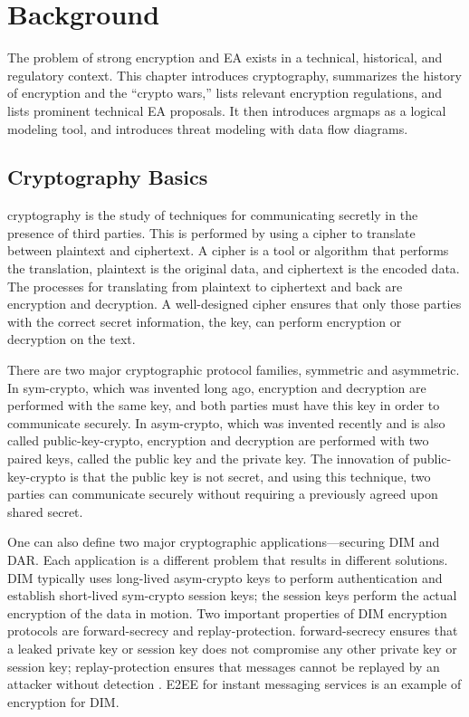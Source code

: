\chapter{Background}
\label{chap-background}

The problem of strong encryption and \acl{EA} exists in a technical, historical, and regulatory context. This chapter
introduces cryptography, summarizes the history of encryption and the ``crypto wars,'' lists relevant encryption
regulations, and lists prominent technical \ac{EA} proposals. It then introduces \acp{argmap} as a logical modeling
tool, and introduces threat modeling with data flow diagrams.



\section{Cryptography Basics}
\label{sec-crypto-basics}

\Ac{cryptography} is the study of techniques for communicating secretly in the presence of third parties. This is
performed by using a \ac{cipher} to translate between \ac{plaintext} and \ac{ciphertext}. A cipher is a tool or
algorithm that performs the translation, plaintext is the original data, and ciphertext is the encoded data. The
processes for translating from plaintext to ciphertext and back are \ac{encryption} and \ac{decryption}. A well-designed
cipher ensures that only those parties with the correct secret information, the \ac{key}, can perform encryption or
decryption on the text.


There are two major cryptographic protocol families, symmetric and asymmetric. In \ac{sym-crypto}, which was invented
long ago, encryption and decryption are performed with the same key, and both parties must have this key in order to
communicate securely. In \ac{asym-crypto}, which was invented recently and is also called \ac{public-key-crypto},
encryption and decryption are performed with two paired keys, called the public key and the private key. The innovation
of \ac{public-key-crypto} is that the public key is not secret, and using this technique, two parties can communicate
securely without requiring a previously agreed upon shared secret.

One can also define two major cryptographic applications---securing \acf{DIM} and \acf{DAR}. Each application is a
different problem that results in different solutions. \Ac{DIM} typically uses long-lived \ac{asym-crypto} keys to
perform authentication and establish short-lived \ac{sym-crypto} session keys; the session keys perform the actual
encryption of the data in motion. Two important properties of \ac{DIM} encryption protocols are \ac{forward-secrecy} and
\ac{replay-protection}. \Ac{forward-secrecy} ensures that a leaked private key or session key does not compromise any
other private key or session key; \ac{replay-protection} ensures that messages cannot be replayed by an attacker without
detection \cite{bellovin_thinking_2016}. \Ac{E2EE} for instant messaging services is an example of encryption for
\ac{DIM}.

